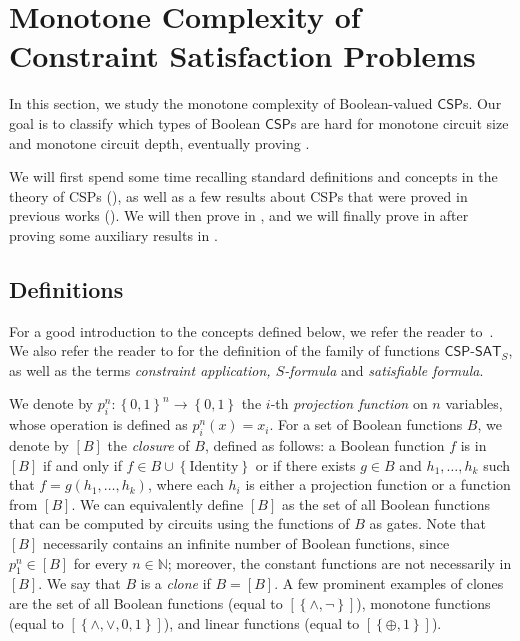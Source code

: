 \documentclass[10pt,a4paper]{article}
\newcommand{\set}[1]{\left\{#1\right\}}
\newcommand{\blt}{\set{0,1}}
\newcommand{\xor}{\oplus}
\newcommand{\CSPf}[1]{\mathsf{CSP}\text{-}\mathsf{SAT}_{#1}}
\newcommand{\CSP}{\mathsf{CSP}}
\newcommand{\clonefont}[1]{\mathrm{#1}}
\def\bbn{{\mathbb N}}
\begin{document}
\section{Monotone Complexity of Constraint Satisfaction Problems}
\label{sec:CSPs}

In this section, we study the monotone complexity of Boolean-valued $\CSP$s.
Our goal is to classify which types of Boolean $\CSP$s are hard for
monotone circuit size and monotone circuit depth,
eventually proving
.

We will first spend some time recalling standard definitions and concepts
in the theory of CSPs (),
as well as a few results about CSPs that were
proved in previous works
\cite{DBLP:conf/stoc/Schaefer78,DBLP:journals/tcs/Jeavons98,
playing_one,playing_two,DBLP:journals/jcss/AllenderBISV09}
().
We will then prove 
in ,
and
we will finally prove 
in 
after 
proving some auxiliary results
in .

\subsection{Definitions}
\label{sec:csp-def}

For a good introduction to the concepts defined below, we refer the reader
to~\cite{playing_one, playing_two}.
We also refer the reader to 
for 
the definition of the family of functions
$\CSPf{S}$, as well as the terms
\emph{constraint application, $S$-formula} and \emph{satisfiable formula}.



We denote by $p_i^n : \blt^n \to \blt$ the
$i$-th \emph{projection function} on $n$ variables,
whose operation is defined as
$p_i^n(x) = x_i$.
For a set of Boolean functions $B$,
we
denote by $[B]$ the \emph{closure} of $B$,
defined as follows:
a Boolean function $f$ is in $[B]$
if and only if
$f \in B \cup \set{\clonefont{Identity}}$
or if there exists $g \in B$
and $h_1,\dots,h_k$
such that
$f = g(h_1,\dots,h_k)$,
where each $h_i$ is either a 
projection function or a function from $[B]$.
We can equivalently define $[B]$ as
the set of all Boolean functions
that can be computed by circuits using 
the functions of $B$ as gates.
Note that $[B]$ necessarily contains an infinite number of Boolean
functions, 
since $p_1^n \in [B]$ for every $n \in \bbn$;
moreover, the constant functions
are not necessarily in $[B]$.
We say that $B$ is a \emph{clone} if $B = [B]$.
A few prominent examples of clones are the set of all Boolean functions
(equal to $[\set{\land,\neg}]$),
monotone functions
(equal to $[\set{\land,\lor,0,1}]$), 
and linear functions
(equal to $[\set{\xor,1}]$).
\end{document}
